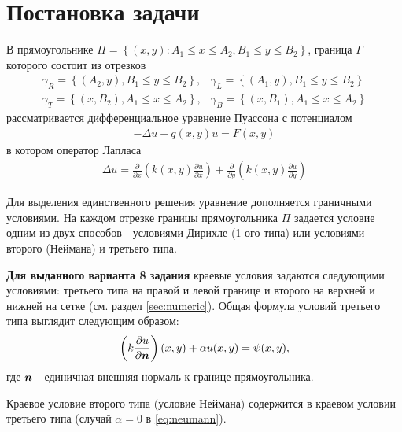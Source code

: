 \documentclass[12pt, fleqn]{article}
\theoremstyle{definition}
\def\vec#1{\mathchoice{\mbox{\boldmath$\displaystyle#1$}}
{\mbox{\boldmath$\textstyle#1$}} {\mbox{\boldmath$\scriptstyle#1$}} {\mbox{\boldmath$\scriptscriptstyle#1$}}}
\begin{document}
\section{Постановка задачи}
В прямоугольнике $\Pi=\left\{(x, y): A_{1} \leqslant x \leqslant A_{2}, B_{1} \leqslant y \leqslant B_{2}\right\}$, граница $\Gamma$ которого состоит из отрезков
\abovedisplayskip=1pt
\belowdisplayskip=2pt
\noindent
$$
\begin{array}{ll}
\gamma_{R}=\left\{\left(A_{2}, y\right), B_{1} \leqslant y \leqslant B_{2}\right\}, & \gamma_{L}=\left\{\left(A_{1}, y\right), B_{1} \leqslant y \leqslant B_{2}\right\} \\
\gamma_{T}=\left\{\left(x, B_{2}\right), A_{1} \leqslant x \leqslant A_{2}\right\}, & \gamma_{B}=\left\{\left(x, B_{1}\right), A_{1} \leqslant x \leqslant A_{2}\right\}
\end{array}
$$
рассматривается дифференциальное уравнение Пуассона с потенциалом
\abovedisplayskip=1pt
\belowdisplayskip=2pt
\noindent
\begin{gather}
-\Delta u+q(x, y) u=F(x, y) \label{eq:poisson}
\end{gather}
в котором оператор Лапласа
\abovedisplayskip=1pt
\belowdisplayskip=2pt
\noindent
\begin{gather}
\Delta u=\frac{\partial}{\partial x}\left(k(x, y) \frac{\partial u}{\partial x}\right)+\frac{\partial}{\partial y}\left(k(x, y) \frac{\partial u}{\partial y}\right) \label{eq:laplace}
\end{gather}

Для выделения единственного решения уравнение дополняется граничными условиями. На каждом отрезке границы прямоугольника $\Pi$ задается условие одним из двух способов - условиями Дирихле (1-ого типа) или условиями второго (Неймана) и третьего типа. 

\textbf{Для выданного варианта 8 задания} краевые условия задаются следующими условиями: третьего типа на правой и левой границе и второго на верхней и нижней на сетке (см. раздел \ref{sec:numeric}). Общая формула условий третьего типа выглядит следующим образом:
\abovedisplayskip=1pt
\belowdisplayskip=2pt
\noindent
\begin{gather}
 \left(k \frac{\partial u}{\partial \vec{n}}\right)(x, y)+\alpha u(x, y)=\psi(x, y),
 \label{eq:neumann}
\end{gather}
где $\vec{n}$ - единичная внешняя нормаль к границе прямоугольника.

Краевое условие второго типа (условие Неймана) содержится в краевом условии третьего типа (случай $\alpha=0$ в \ref{eq:neumann}).
\end{document}
